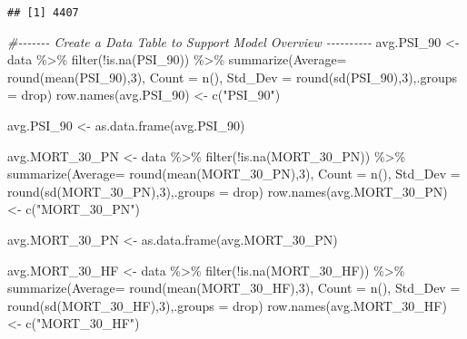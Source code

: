 \documentclass[
]{article}
\newenvironment{Shaded}{\begin{snugshade}}{\end{snugshade}}
\newcommand{\AttributeTok}[1]{\textcolor[rgb]{0.77,0.63,0.00}{#1}}
\newcommand{\CommentTok}[1]{\textcolor[rgb]{0.56,0.35,0.01}{\textit{#1}}}
\newcommand{\DecValTok}[1]{\textcolor[rgb]{0.00,0.00,0.81}{#1}}
\newcommand{\FunctionTok}[1]{\textcolor[rgb]{0.00,0.00,0.00}{#1}}
\newcommand{\NormalTok}[1]{#1}
\newcommand{\OtherTok}[1]{\textcolor[rgb]{0.56,0.35,0.01}{#1}}
\newcommand{\SpecialCharTok}[1]{\textcolor[rgb]{0.00,0.00,0.00}{#1}}
\newcommand{\StringTok}[1]{\textcolor[rgb]{0.31,0.60,0.02}{#1}}
\begin{document}
\begin{verbatim}
## [1] 4407
\end{verbatim}

\begin{Shaded}
\begin{Highlighting}[]
\CommentTok{\#{-}{-}{-}{-}{-}{-}{-} Create a Data Table to Support Model Overview {-}{-}{-}{-}{-}{-}{-}{-}{-}{-}}
\NormalTok{avg.PSI\_90 }\OtherTok{\textless{}{-}} 
\NormalTok{data }\SpecialCharTok{\%\textgreater{}\%} \FunctionTok{filter}\NormalTok{(}\SpecialCharTok{!}\FunctionTok{is.na}\NormalTok{(PSI\_90)) }\SpecialCharTok{\%\textgreater{}\%}  
\FunctionTok{summarize}\NormalTok{(}\AttributeTok{Average=} \FunctionTok{round}\NormalTok{(}\FunctionTok{mean}\NormalTok{(PSI\_90),}\DecValTok{3}\NormalTok{), }\AttributeTok{Count =} \FunctionTok{n}\NormalTok{(), }\AttributeTok{Std\_Dev =} \FunctionTok{round}\NormalTok{(}\FunctionTok{sd}\NormalTok{(PSI\_90),}\DecValTok{3}\NormalTok{),}\AttributeTok{.groups =} \StringTok{\textquotesingle{}drop\textquotesingle{}}\NormalTok{) }
\FunctionTok{row.names}\NormalTok{(avg.PSI\_90) }\OtherTok{\textless{}{-}} \FunctionTok{c}\NormalTok{(}\StringTok{"PSI\_90"}\NormalTok{)}

\NormalTok{avg.PSI\_90 }\OtherTok{\textless{}{-}} \FunctionTok{as.data.frame}\NormalTok{(avg.PSI\_90) }

\NormalTok{avg.MORT\_30\_PN }\OtherTok{\textless{}{-}} 
\NormalTok{data }\SpecialCharTok{\%\textgreater{}\%} \FunctionTok{filter}\NormalTok{(}\SpecialCharTok{!}\FunctionTok{is.na}\NormalTok{(MORT\_30\_PN)) }\SpecialCharTok{\%\textgreater{}\%}  
\FunctionTok{summarize}\NormalTok{(}\AttributeTok{Average=} \FunctionTok{round}\NormalTok{(}\FunctionTok{mean}\NormalTok{(MORT\_30\_PN),}\DecValTok{3}\NormalTok{), }\AttributeTok{Count =} \FunctionTok{n}\NormalTok{(), }\AttributeTok{Std\_Dev =} \FunctionTok{round}\NormalTok{(}\FunctionTok{sd}\NormalTok{(MORT\_30\_PN),}\DecValTok{3}\NormalTok{),}\AttributeTok{.groups =} \StringTok{\textquotesingle{}drop\textquotesingle{}}\NormalTok{) }
\FunctionTok{row.names}\NormalTok{(avg.MORT\_30\_PN) }\OtherTok{\textless{}{-}} \FunctionTok{c}\NormalTok{(}\StringTok{"MORT\_30\_PN"}\NormalTok{)}

\NormalTok{avg.MORT\_30\_PN }\OtherTok{\textless{}{-}} \FunctionTok{as.data.frame}\NormalTok{(avg.MORT\_30\_PN) }

\NormalTok{avg.MORT\_30\_HF }\OtherTok{\textless{}{-}} 
\NormalTok{data }\SpecialCharTok{\%\textgreater{}\%} \FunctionTok{filter}\NormalTok{(}\SpecialCharTok{!}\FunctionTok{is.na}\NormalTok{(MORT\_30\_HF)) }\SpecialCharTok{\%\textgreater{}\%}  
\FunctionTok{summarize}\NormalTok{(}\AttributeTok{Average=} \FunctionTok{round}\NormalTok{(}\FunctionTok{mean}\NormalTok{(MORT\_30\_HF),}\DecValTok{3}\NormalTok{), }\AttributeTok{Count =} \FunctionTok{n}\NormalTok{(), }\AttributeTok{Std\_Dev =} \FunctionTok{round}\NormalTok{(}\FunctionTok{sd}\NormalTok{(MORT\_30\_HF),}\DecValTok{3}\NormalTok{),}\AttributeTok{.groups =} \StringTok{\textquotesingle{}drop\textquotesingle{}}\NormalTok{) }
\FunctionTok{row.names}\NormalTok{(avg.MORT\_30\_HF) }\OtherTok{\textless{}{-}} \FunctionTok{c}\NormalTok{(}\StringTok{"MORT\_30\_HF"}\NormalTok{)}


\end{Highlighting}
\end{Shaded}
\end{document}

